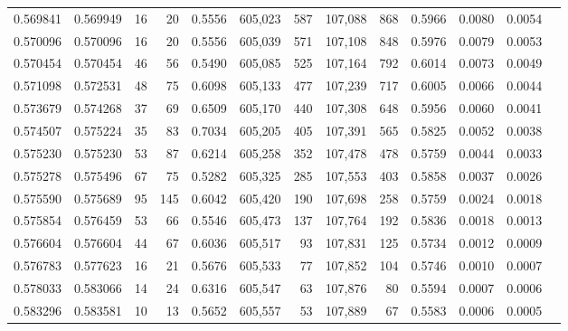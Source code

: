 \begin{tabular}{rrrrrrrrrrrrr}
0.569841 & 0.569949 &    16 &    20 &                                     0.5556 & 605,023 &     587 & 107,088 &     868 & 0.5966 & 0.0080 & 0.0054 \\
0.570096 & 0.570096 &    16 &    20 &                                     0.5556 & 605,039 &     571 & 107,108 &     848 & 0.5976 & 0.0079 & 0.0053 \\
0.570454 & 0.570454 &    46 &    56 &                                     0.5490 & 605,085 &     525 & 107,164 &     792 & 0.6014 & 0.0073 & 0.0049 \\
0.571098 & 0.572531 &    48 &    75 &                                     0.6098 & 605,133 &     477 & 107,239 &     717 & 0.6005 & 0.0066 & 0.0044 \\
0.573679 & 0.574268 &    37 &    69 &                                     0.6509 & 605,170 &     440 & 107,308 &     648 & 0.5956 & 0.0060 & 0.0041 \\
0.574507 & 0.575224 &    35 &    83 &                                     0.7034 & 605,205 &     405 & 107,391 &     565 & 0.5825 & 0.0052 & 0.0038 \\
0.575230 & 0.575230 &    53 &    87 &                                     0.6214 & 605,258 &     352 & 107,478 &     478 & 0.5759 & 0.0044 & 0.0033 \\
0.575278 & 0.575496 &    67 &    75 &                                     0.5282 & 605,325 &     285 & 107,553 &     403 & 0.5858 & 0.0037 & 0.0026 \\
0.575590 & 0.575689 &    95 &   145 &                                     0.6042 & 605,420 &     190 & 107,698 &     258 & 0.5759 & 0.0024 & 0.0018 \\
0.575854 & 0.576459 &    53 &    66 &                                     0.5546 & 605,473 &     137 & 107,764 &     192 & 0.5836 & 0.0018 & 0.0013 \\
0.576604 & 0.576604 &    44 &    67 &                                     0.6036 & 605,517 &      93 & 107,831 &     125 & 0.5734 & 0.0012 & 0.0009 \\
0.576783 & 0.577623 &    16 &    21 &                                     0.5676 & 605,533 &      77 & 107,852 &     104 & 0.5746 & 0.0010 & 0.0007 \\
0.578033 & 0.583066 &    14 &    24 &                                     0.6316 & 605,547 &      63 & 107,876 &      80 & 0.5594 & 0.0007 & 0.0006 \\
0.583296 & 0.583581 &    10 &    13 &                                     0.5652 & 605,557 &      53 & 107,889 &      67 & 0.5583 & 0.0006 & 0.0005 \\

\end{tabular}
